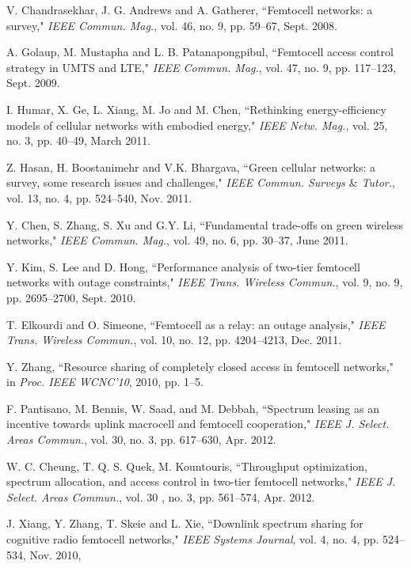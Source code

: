 \documentclass[10pt,final,journal,letterpaper,twoside,twocolumn]{IEEEtran}
\begin{document}
\begin{thebibliography}{1}
V. Chandrasekhar, J. G. Andrews and A. Gatherer, ``Femtocell networks: a
survey," {\em IEEE Commun. Mag.}, vol. 46, no. 9, pp. 59--67, Sept. 2008.

A. Golaup, M. Mustapha and L. B. Patanapongpibul, ``Femtocell access control
strategy in UMTS and LTE," {\em IEEE Commun. Mag.}, vol. 47, no. 9, pp.
117--123, Sept. 2009.

I. Humar, X. Ge, L. Xiang, M. Jo and M. Chen, ``Rethinking energy-efficiency
models of cellular networks with embodied energy," {\em IEEE Netw. Mag.},
vol. 25, no. 3, pp. 40--49, March 2011.

Z. Hasan, H. Boostanimehr and V.K. Bhargava, ``Green cellular networks: a survey,
some research issues and challenges," {\em IEEE Commun. Surveys $\&$ Tutor.},
vol. 13, no. 4, pp. 524--540, Nov. 2011.

Y. Chen, S. Zhang, S. Xu and G.Y. Li, ``Fundamental trade-offs on green wireless
networks," {\em IEEE Commun. Mag.}, vol. 49, no. 6, pp. 30--37, June 2011.

Y. Kim, S. Lee and D. Hong, ``Performance analysis of two-tier femtocell
networks with outage constraints," {\em IEEE Trans. Wireless Commun.}, vol.
9, no. 9, pp. 2695--2700, Sept. 2010.

T. Elkourdi and O. Simeone, ``Femtocell as a relay: an outage analysis," {\em
IEEE Trans. Wireless Commun.}, vol. 10, no. 12, pp. 4204--4213, Dec. 2011.

Y. Zhang, ``Resource sharing of completely closed access in femtocell
networks," in {\em Proc. IEEE WCNC'10}, 2010, pp. 1--5.

F. Pantisano, M. Bennis, W. Saad, and M. Debbah, ``Spectrum leasing as an incentive towards uplink macrocell and femtocell cooperation," {\em  IEEE J. Select. Areas Commun.}, vol. 30, no. 3, pp. 617--630, Apr. 2012.

W. C. Cheung, T. Q. S. Quek, M. Kountouris, ``Throughput optimization, spectrum allocation, and access control in two-tier femtocell networks," {\em  IEEE J. Select. Areas Commun.},  vol. 30 , no. 3,  pp. 561--574, Apr. 2012.

J. Xiang, Y. Zhang, T. Skeie and L. Xie, ``Downlink spectrum sharing for
cognitive radio femtocell networks," {\em IEEE Systems Journal}, vol. 4, no.
4, pp. 524--534, Nov. 2010,


\end{thebibliography}
\end{document}
